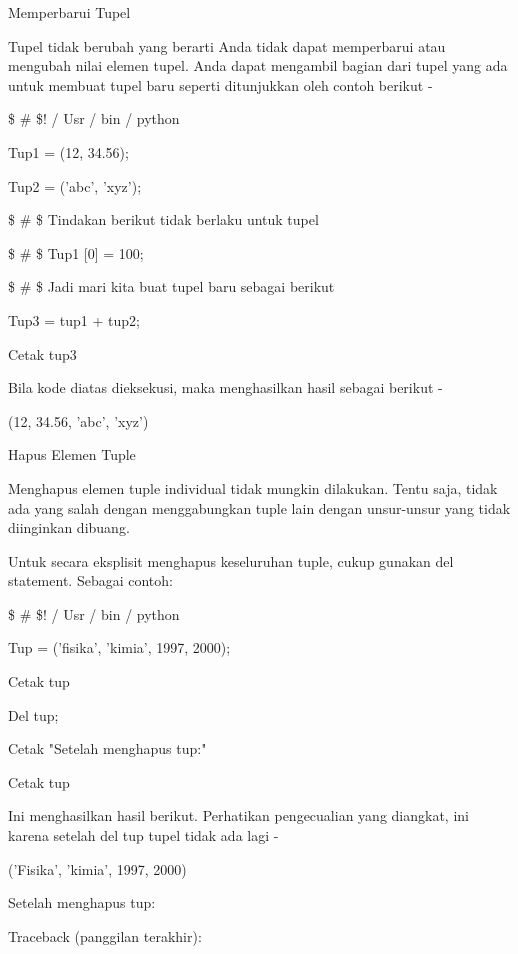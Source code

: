 Memperbarui Tupel \par
Tupel tidak berubah yang berarti Anda tidak dapat memperbarui atau mengubah nilai elemen tupel. Anda dapat mengambil bagian dari tupel yang ada untuk membuat tupel baru seperti ditunjukkan oleh contoh berikut - \par
 \$  \#  \$! / Usr / bin / python \par
\vspace{12pt}
Tup1 = (12, 34.56); \par
Tup2 = ('abc', 'xyz'); \par
\vspace{12pt}
 \$  \# \$ Tindakan berikut tidak berlaku untuk tupel \par
 \$  \#  \$ Tup1 [0] = 100; \par
\vspace{12pt}
 \$  \#  \$ Jadi mari kita buat tupel baru sebagai berikut \par
Tup3 = tup1 + tup2; \par
Cetak tup3 \par
Bila kode diatas dieksekusi, maka menghasilkan hasil sebagai berikut - \par
(12, 34.56, 'abc', 'xyz') \par
Hapus Elemen Tuple \par
Menghapus elemen tuple individual tidak mungkin dilakukan. Tentu saja, tidak ada yang salah dengan menggabungkan tuple lain dengan unsur-unsur yang tidak diinginkan dibuang. \par
Untuk secara eksplisit menghapus keseluruhan tuple, cukup gunakan del statement. Sebagai contoh: \par
 \$  \#  \$! / Usr / bin / python \par
\vspace{12pt}
Tup = ('fisika', 'kimia', 1997, 2000); \par
\vspace{12pt}
Cetak tup \par
Del tup; \par
Cetak "Setelah menghapus tup:" \par
Cetak tup \par
Ini menghasilkan hasil berikut. Perhatikan pengecualian yang diangkat, ini karena setelah del tup tupel tidak ada lagi - \par
('Fisika', 'kimia', 1997, 2000) \par
Setelah menghapus tup: \par
Traceback (panggilan terakhir): \par
